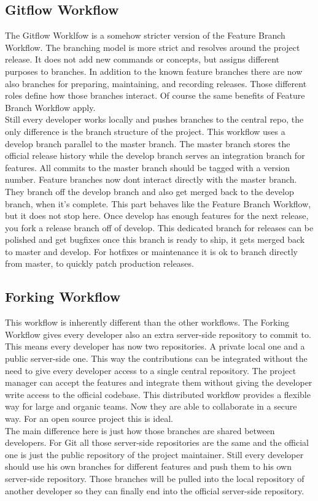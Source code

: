 \subsection{Gitflow Workflow}
The Gitflow Worklfow is a somehow stricter version of the Feature Branch Workflow. The branching model is more strict and resolves around the project release.
It does not add new commands or concepts, but assigns different purposes to branches. In addition to the known feature branches there are now also branches 
for preparing, maintaining, and recording releases. Those different roles define how those branches interact. Of course the same benefits of Feature Branch Workflow apply.
\\
Still every developer works locally and pushes branches to the central repo, the only difference is the branch structure of the project.
This workflow uses a develop branch parallel to the master branch. The master branch stores the official release history while the develop branch serves an integration branch for features.
All commits to the master branch should be tagged with a version number.
Feature branches now dont interact directly with the master branch. They branch off the develop branch and also get merged back to the develop branch, when it's complete.
This part behaves like the Feature Branch Workflow, but it does not stop here.
Once develop has enough features for the next release, you fork a release branch off of develop. This dedicated branch for releases can be polished and get bugfixes 
once this branch is ready to ship, it gets merged back to master and develop. For hotfixes or maintenance it is ok to branch directly from master, to quickly patch production releases.
\\
\subsection{Forking Workflow}
This workflow is inherently different than the other workflows. The Forking Workflow gives every developer also an extra server-side repository to commit to.
This means every developer has now two repositories. A private local one and a public server-side one. This way the contributions can be integrated without
 the need to give every developer access to a single central repository. The project manager can accept the features and integrate them without giving the developer write 
access to the official codebase. This distributed workflow provides a flexible way for large and organic teams. Now they are able to collaborate in a secure way. For an open source 
project this is ideal.
\\
The main difference here is just how those branches are shared between developers. For Git all those server-side repositories are the same and the official one is just the public 
repository of the project maintainer. Still every developer should use his own branches for different features and push them to his own server-side repository. Those branches will be pulled 
into the local repository of another developer so they can finally end into the official server-side repository.





